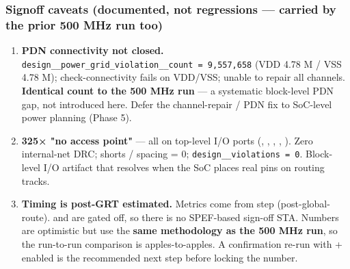 \subsubsection{Signoff caveats (documented, not regressions --- carried
by the prior 500 MHz run too)}\label{cr:run:asap7-gpu:signoff-caveats-documented-not-regressions-carried-by-the-prior-500-mhz-run-too}

\begin{record}

\begin{enumerate}
\def\labelenumi{\arabic{enumi}.}
\tightlist
\item
  \textbf{PDN connectivity not closed.}
  \texttt{design\_\allowbreak{}\_\allowbreak{}power\_\allowbreak{}grid\_\allowbreak{}violation\_\allowbreak{}\_\allowbreak{}count\ =\allowbreak{}\ 9,\allowbreak{}557,\allowbreak{}658}
  (VDD 4.78 M / VSS 4.78 M);  check-connectivity fails on
  VDD/VSS;  unable to repair all channels.
  \textbf{Identical count to the 500 MHz run} --- a systematic
  block-level PDN gap, not introduced here. Defer the channel-repair /
  PDN fix to SoC-level power planning (Phase 5).
\item
  \textbf{325×  "no access point"} --- all on top-level
  I/O ports (, , , ,
  ). Zero internal-net DRC;  shorts
  / spacing = 0;
  \texttt{design\_\allowbreak{}\_\allowbreak{}violations\ =\allowbreak{}\ 0}.
  Block-level I/O artifact that resolves when the SoC places real pins
  on routing tracks.
\item
  \textbf{Timing is post-GRT estimated.} Metrics come from step
   (post-global-route). 
  and  are gated off, so there is no SPEF-based sign-off STA.
  Numbers are optimistic but use the \textbf{same methodology as the 500
  MHz run}, so the run-to-run comparison is apples-to-apples. A
  confirmation re-run with  +  enabled is the
  recommended next step before locking the number.
\end{enumerate}


\end{record}
